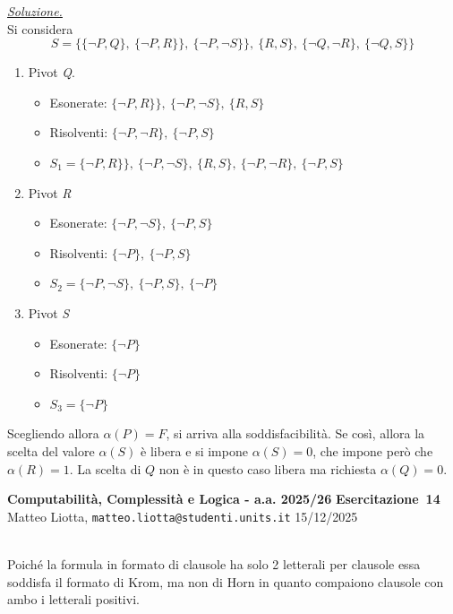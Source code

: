 \documentclass[a4paper,10pt]{article}
\makeatletter
\newcommand{\EsercitazioneNum}{14}
\newcommand{\Data}{15/12/2025}
\newcommand{\DocType}{Esercitazione} %
\newcommand{\FullTitle}{\DocType\ \EsercitazioneNum}
\newcommand{\Header}{
\noindent
  \small \textbf{Computabilità, Complessità e Logica - a.a. 2025/26} \hfill \textbf{\FullTitle} \\[0.2cm]
  \scriptsize Matteo Liotta, \texttt{matteo.liotta@studenti.units.it} \hfill \Data \\[0.2cm]
  \noindent\makebox[\linewidth]{\rule{\linewidth}{0.4pt}} \\[0.3cm]}
\newcommand{\NewPageHeader}{
  \vfill
  \noindent\makebox[\linewidth]{\rule{\linewidth}{0.4pt}}
  \newpage
  {\Header}
}
\makeatother
\begin{document}
{\begin{itemize}[label=, leftmargin=0pt]
    \begin{osservazioni}
    \underline{\textit{Soluzione.}}\\
    Si considera
    $$ S = \{\{\lnot P,Q\},\ \{\lnot P,R\}\},\ \{\lnot P,\lnot S\}\},\ \{R,S\},\ \{\lnot Q,\lnot R\},\ \{\lnot Q,S\}\}$$
    \begin{enumerate}
        \item Pivot \textit{Q}.
        \begin{itemize}
            \item Esonerate: $\{\lnot P,R\}\},\ \{\lnot P,\lnot S\},\ \{R,S\}$
            \item Risolventi: $\{\lnot P,\lnot R\},\ \{\lnot P,S\}$
            \item $S_1 = \{\lnot P,R\}\},\ \{\lnot P,\lnot S\},\ \{R,S\},\ \{\lnot P,\lnot R\},\ \{\lnot P,S\}$
        \end{itemize}
        \item Pivot \textit{R}
        \begin{itemize}
            \item Esonerate: $\{\lnot P,\lnot S\},\ \{\lnot P,S\}$
            \item Risolventi: $\{\lnot P \},\ \{\lnot P,S\}$
            \item $S_2 = \{\lnot P,\lnot S\},\ \{\lnot P,S\},\ \{\lnot P \}$
        \end{itemize}
        \item Pivot \textit{S}
        \begin{itemize}
            \item Esonerate: $\{\lnot P \}$
            \item Risolventi: $\{\lnot P \}$
            \item $S_3 = \{\lnot P \}$
        \end{itemize}
    \end{enumerate}
    Scegliendo allora $\alpha(P)=F$, si arriva alla soddisfacibilità. Se così, allora la scelta del valore $\alpha(S)$ è libera e si impone $\alpha(S)=0$, che impone però che $\alpha(R)=1$. La scelta di $Q$ non è in questo caso libera ma richiesta $\alpha(Q)=0$. 
    \end{osservazioni}
    \NewPageHeader
    \begin{osservazioni}
    Poiché la formula in formato di clausole ha solo 2 letterali per clausole essa soddisfa il formato di Krom, ma non di Horn in quanto compaiono clausole con ambo i letterali positivi.
    \end{osservazioni}
    

\end{itemize}}
\end{document}
